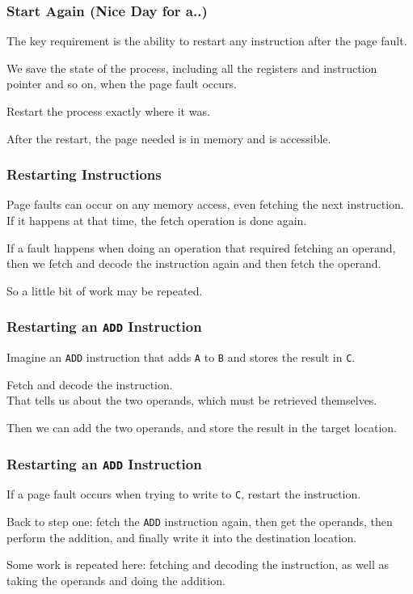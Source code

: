 \begin{frame}
\frametitle{Start Again (Nice Day for a..)}

The key requirement is the ability to restart any instruction after the page fault.

We save the state of the process, including all the registers and instruction pointer and so on, when the page fault occurs. 

Restart the process exactly where it was. 

After the restart, the page needed is in memory and is accessible.

\end{frame}

\begin{frame}
\frametitle{Restarting Instructions}

Page faults can occur on any memory access, even fetching the next instruction.\\
\quad If it happens at that time, the fetch operation is done again. 

If a fault happens when doing an operation that required fetching an operand, then we fetch and decode the instruction again and then fetch the operand. 

So a little bit of work may be repeated.

\end{frame}



\begin{frame}
\frametitle{Restarting an \texttt{ADD} Instruction}

Imagine an \texttt{ADD} instruction that adds \texttt{A} to \texttt{B} and stores the result in \texttt{C}. 

Fetch and decode the instruction.\\
\quad That tells us about the two operands, which must be retrieved themselves. 

Then we can add the two operands, and store the result in the target location.

\end{frame}

\begin{frame}
\frametitle{Restarting an \texttt{ADD} Instruction}

If a page fault occurs when trying to write to \texttt{C}, restart the instruction. 

Back to step one: fetch the \texttt{ADD} instruction again, then get the operands, then perform the addition, and finally write it into the destination location.

Some work is repeated here: fetching and decoding the instruction, as well as taking the operands and doing the addition. 

\end{frame}

